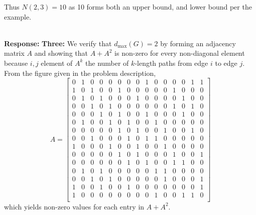 \documentclass{article}
\newcommand{\response}[1]{\leavevmode\\[0.05in]{\bf Response: } #1 \leavevmode\\[0.05in]}
\begin{document}
{\begin{center}
\end{center} Thus $N(2,3) = 10$ as 10 forms both an upper bound, and lower bound per the example.} 
	\response{{\bf Three: } We verify that $d_{\text{max}}(G) = 2$ by forming an adjacency matrix $A$ and showing that $A + A^2$ is non-zero for every non-diagonal element because $i,j$ element of $A^k$ the number of $k$-length paths from edge $i$ to edge $j$. From the figure given in the problem description, 
		\begin{equation*}
			A = \begin{bmatrix} 0 & 1 & 0 & 0 & 0 & 0 & 0 & 0 & 1 & 0 & 0 & 0 & 0 & 1 & 1 \\ 
				            1 & 0 & 1 & 0 & 0 & 1 & 0 & 0 & 0 & 0 & 0 & 1 & 0 & 0 & 0 \\
				            0 & 1 & 0 & 1 & 0 & 0 & 0 & 1 & 0 & 0 & 0 & 0 & 1 & 0 & 0 \\
					    0 & 0 & 1 & 0 & 1 & 0 & 0 & 0 & 0 & 0 & 0 & 1 & 0 & 1 & 0 \\
					    0 & 0 & 0 & 1 & 0 & 1 & 0 & 0 & 1 & 0 & 0 & 0 & 1 & 0 & 0 \\
					    0 & 1 & 0 & 0 & 1 & 0 & 1 & 0 & 0 & 1 & 0 & 0 & 0 & 0 & 0 \\
					    0 & 0 & 0 & 0 & 0 & 1 & 0 & 1 & 0 & 0 & 1 & 0 & 0 & 1 & 0 \\
					    0 & 0 & 1 & 0 & 0 & 0 & 1 & 0 & 1 & 1 & 0 & 0 & 0 & 0 & 0 \\
					    1 & 0 & 0 & 0 & 1 & 0 & 0 & 1 & 0 & 0 & 1 & 0 & 0 & 0 & 0 \\
					    0 & 0 & 0 & 0 & 0 & 1 & 0 & 1 & 0 & 0 & 0 & 1 & 0 & 0 & 1 \\
					    0 & 0 & 0 & 0 & 0 & 0 & 1 & 0 & 1 & 0 & 0 & 1 & 1 & 0 & 0 \\
					    0 & 1 & 0 & 1 & 0 & 0 & 0 & 0 & 0 & 1 & 1 & 0 & 0 & 0 & 0 \\
					    0 & 0 & 1 & 0 & 1 & 0 & 0 & 0 & 0 & 0 & 1 & 0 & 0 & 0 & 1 \\
					    1 & 0 & 0 & 1 & 0 & 0 & 1 & 0 & 0 & 0 & 0 & 0 & 0 & 0 & 1 \\
					    1 & 0 & 0 & 0 & 0 & 0 & 0 & 0 & 0 & 1 & 0 & 0 & 1 & 1 & 0 \\
			\end{bmatrix}
		\end{equation*}
		which yields non-zero values for each entry in $A + A^2$.
	}
\end{document}
